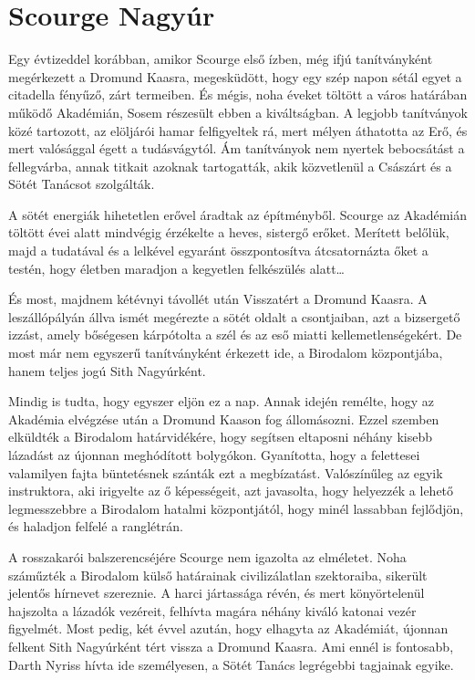 \documentclass{thesis-ekf}
\theoremstyle{definition}
\begin{document}
\section{Scourge Nagyúr}
Egy évtizeddel korábban, amikor Scourge első ízben, még ifjú tanítványként megérkezett a
Dromund Kaasra, megesküdött, hogy egy szép napon sétál egyet a citadella fényűző, zárt
termeiben. És mégis, noha éveket töltött a város határában működő Akadémián, Sosem
részesült ebben a kiváltságban. A legjobb tanítványok közé tartozott, az elöljárói hamar
felfigyeltek rá, mert mélyen áthatotta az Erő, és mert valósággal égett a tudásvágytól. Ám
tanítványok nem nyertek bebocsátást a fellegvárba, annak titkait azoknak tartogatták, akik
közvetlenül a Császárt és a Sötét Tanácsot szolgálták.

A sötét energiák hihetetlen erővel áradtak az építményből. Scourge az Akadémián töltött évei
alatt mindvégig érzékelte a heves, sistergő erőket. Merített belőlük, majd a tudatával és a
lelkével egyaránt összpontosítva átcsatornázta őket a testén, hogy életben maradjon a
kegyetlen felkészülés alatt\dots

És most, majdnem kétévnyi távollét után Visszatért a Dromund Kaasra. A leszállópályán állva
ismét megérezte a sötét oldalt a csontjaiban, azt a bizsergető izzást, amely bőségesen
kárpótolta a szél és az eső miatti kellemetlenségekért. De most már nem egyszerű
tanítványként érkezett ide, a Birodalom központjába, hanem teljes jogú Sith Nagyúrként.

Mindig is tudta, hogy egyszer eljön ez a nap. Annak idején remélte, hogy az Akadémia
elvégzése után a Dromund Kaason fog állomásozni. Ezzel szemben elküldték a Birodalom
határvidékére, hogy segítsen eltaposni néhány kisebb lázadást az újonnan meghódított
bolygókon. Gyanította, hogy a felettesei valamilyen fajta büntetésnek szánták ezt a
megbízatást. Valószínűleg az egyik instruktora, aki irigyelte az ő képességeit, azt javasolta,
hogy helyezzék a lehető legmesszebbre a Birodalom hatalmi központjától, hogy minél
lassabban fejlődjön, és haladjon felfelé a ranglétrán.

A rosszakarói balszerencséjére Scourge nem igazolta az elméletet. Noha száműzték a
Birodalom külső határainak civilizálatlan szektoraiba, sikerült jelentős hírnevet szereznie. A harci
jártassága révén, és mert könyörtelenül hajszolta a lázadók vezéreit, felhívta magára néhány
kiváló katonai vezér figyelmét. Most pedig, két évvel azután, hogy elhagyta az Akadémiát,
újonnan felkent Sith Nagyúrként tért vissza a Dromund Kaasra. Ami ennél is fontosabb, Darth
Nyriss hívta ide személyesen, a Sötét Tanács legrégebbi tagjainak egyike.
\end{document}
